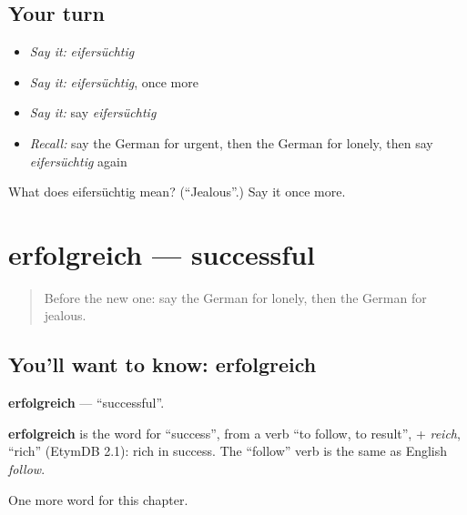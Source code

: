 \subsection*{Your turn}
\begin{itemize}
\raggedright
  \item \emph{Say it:} \emph{eifersüchtig}
  \item \emph{Say it:} \emph{eifersüchtig}, once more
  \item \emph{Say it:} say \emph{eifersüchtig}
  \item \emph{Recall:} say the German for urgent, then the German for lonely, then say \emph{eifersüchtig} again
\end{itemize}

\begin{tcolorbox}[breakable,colback=teal!4,colframe=teal!35!black,title={Before you move on}]
What does eifersüchtig mean? (\textquotedblleft{}Jealous\textquotedblright{}.) Say it once more.
\end{tcolorbox}
\section[erfolgreich]{erfolgreich — successful}

\label{lesson:GE-C213-erfolgreich}



\begin{quote}
Before the new one: say the German for lonely, then the German for jealous.
\end{quote}

\subsection*{You'll want to know: erfolgreich}
\textbf{erfolgreich} — \textquotedblleft{}successful\textquotedblright{}.

\begin{cousinweb}
\textbf{erfolgreich} is the word for \textquotedblleft{}success\textquotedblright{}, from a verb \textquotedblleft{}to follow, to result\textquotedblright{}, + \emph{reich}, \textquotedblleft{}rich\textquotedblright{} (EtymDB 2.1): rich in success. The \textquotedblleft{}follow\textquotedblright{} verb is the same as English \emph{follow}.
\end{cousinweb}

\begin{grammarlens}[title={What you've built}]
One more word for this chapter.
\end{grammarlens}

